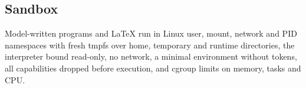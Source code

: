 \subsection{Sandbox}
Model-written programs and LaTeX run in Linux user, mount, network and PID namespaces with fresh tmpfs over home, temporary and runtime directories, the interpreter bound read-only, no network, a minimal environment without tokens, all capabilities dropped before execution, and cgroup limits on memory, tasks and CPU.
